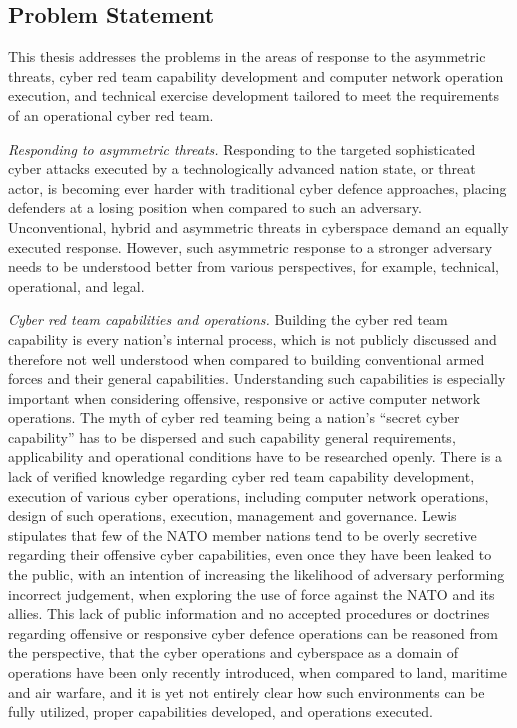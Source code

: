 \subsection{Problem Statement}
\label{sec:problem}
\glsresetall
This thesis addresses the problems in the areas of response to the asymmetric threats, cyber red team capability development and computer network operation execution, and technical exercise development tailored to meet the requirements of an operational cyber red team.

\textit{Responding to asymmetric threats.}
Responding to the targeted sophisticated cyber attacks executed by a technologically advanced nation state, or threat actor, is becoming ever harder with traditional cyber defence approaches, placing defenders at a losing position when compared to such an adversary. Unconventional, hybrid and asymmetric threats in cyberspace demand an equally executed response. However, such asymmetric response to a stronger adversary needs to be understood better from various perspectives, for example, technical, operational, and legal.

\textit{Cyber red team capabilities and operations.}
Building the cyber red team capability is every nation's internal process, which is not publicly discussed and therefore not well understood when compared to building conventional armed forces and their general capabilities. Understanding such capabilities is especially important when considering offensive, responsive or active computer network operations. The myth of cyber red teaming being a nation's ``secret cyber capability'' has to be dispersed and such capability general requirements, applicability and operational conditions have to be researched openly. There is a lack of verified knowledge regarding cyber red team capability development, execution of various cyber operations, including computer network operations, design of such operations, execution, management and governance. Lewis \cite{Lewis2015} stipulates that few of the NATO member nations tend to be overly secretive regarding their offensive cyber capabilities, even once they have been leaked to the public, with an intention of increasing the likelihood of adversary performing incorrect judgement, when exploring the use of force against the NATO and its allies. This lack of public information and no accepted procedures or doctrines regarding offensive or responsive cyber defence operations can be reasoned from the perspective, that the cyber operations and cyberspace as a domain of operations have been only recently introduced, when compared to land, maritime and air warfare, and it is yet not entirely clear how such environments can be fully utilized, proper capabilities developed, and operations executed.

